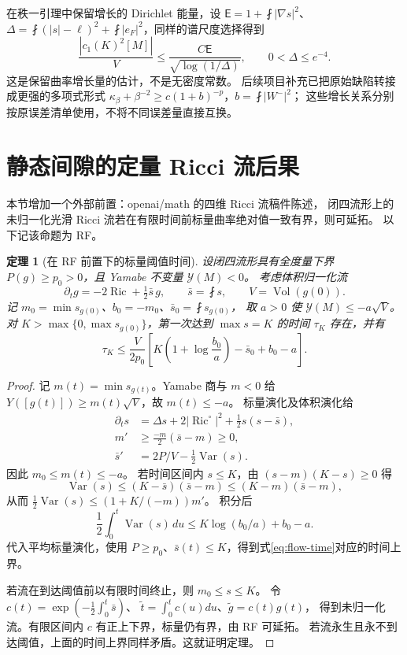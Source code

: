 \documentclass[UTF8,11pt,a4paper,fontset=none]{ctexart}
\numberwithin{equation}{section}
\newtheorem{theorem}{定理}[section]
\theoremstyle{definition}
\theoremstyle{remark}\newtheorem{remark}[theorem]{说明}
\newcommand{\Ric}{\operatorname{Ric}}
\newcommand{\Vol}{\operatorname{Vol}}
\newcommand{\Var}{\operatorname{Var}}
\newcommand{\avint}{\fint}
\begin{document}
在秩一引理中保留增长的 Dirichlet 能量，设
$\mathsf E=1+\avint|\nabla s|^2$、
$\Delta=\avint(|s|-\ell)^2+\avint|e_F|^2$，同样的谱尺度选择得到\cite{QuantEscape}
\[
\frac{|c_1(K)^2[M]|}{V}
\le\frac{C\mathsf E}{\sqrt{\log(1/\Delta)}},\qquad0<\Delta\le e^{-4}.
\]
这是保留曲率增长量的估计，不是无密度常数。
后续项目补充已把原始缺陷转接成更强的多项式形式
$\kappa_\beta+\beta^{-2}\ge c(1+b)^{-p}$，$b=\avint|W^-|^2$\cite{WeightedReport}；
这些增长关系分别按原误差清单使用，不将不同误差量直接互换。

\section{静态间隙的定量 Ricci 流后果}\label{sec:flow}

本节增加一个外部前置：openai/math 的四维 Ricci 流稿件陈述，
闭四流形上的未归一化光滑 Ricci 流若在有限时间前标量曲率绝对值一致有界，则可延拓\cite{OAIFlow}。
以下记该命题为 \textup{RF}。

\begin{theorem}[在 RF 前置下的标量阈值时间]\label{thm:flow}
设闭四流形具有全度量下界 $P(g)\ge p_0>0$，且 Yamabe 不变量 $\mathcal Y(M)<0$。
考虑体积归一化流
\[
\partial_tg=-2\Ric+\tfrac12\bar s\,g,\qquad \bar s=\avint s,
\qquad V=\Vol(g(0)).
\]
记 $m_0=\min s_{g(0)}$、$b_0=-m_0$、$\bar s_0=\avint s_{g(0)}$，
取 $a>0$ 使 $\mathcal Y(M)\le-a\sqrt V$。
对 $K>\max\{0,\max s_{g(0)}\}$，第一次达到 $\max s=K$ 的时间 $\tau_K$ 存在，并有
\begin{equation}\label{eq:flow-time}
\boxed{\tau_K\le\frac{V}{2p_0}
\left[K\left(1+\log\frac{b_0}{a}\right)-\bar s_0+b_0-a\right].}
\end{equation}
\end{theorem}
\begin{proof}
记 $m(t)=\min s_{g(t)}$。Yamabe 商与 $m<0$ 给
$Y([g(t)])\ge m(t)\sqrt V$，故 $m(t)\le-a$。
标量演化及体积演化给\cite{Ishida}
\begin{align*}
\partial_ts&=\Delta s+2|\Ric^\circ|^2+\tfrac12s(s-\bar s),\\
m'&\ge\tfrac{-m}{2}(\bar s-m)\ge0,\\
\bar s'&=2P/V-\tfrac12\Var(s).
\end{align*}
因此 $m_0\le m(t)\le-a$。
若时间区间内 $s\le K$，由 $(s-m)(K-s)\ge0$ 得
\[
\Var(s)\le(K-\bar s)(\bar s-m)\le(K-m)(\bar s-m),
\]
从而 $\tfrac12\Var(s)\le(1+K/(-m))m'$。
积分后
\[
\frac12\int_0^t\Var(s)\,du\le K\log(b_0/a)+b_0-a.
\]
代入平均标量演化，使用 $P\ge p_0$、$\bar s(t)\le K$，得到式\eqref{eq:flow-time}对应的时间上界。

若流在到达阈值前以有限时间终止，则 $m_0\le s\le K$。
令 $c(t)=\exp(-\tfrac12\int_0^t\bar s)$、
$\widetilde t=\int_0^tc(u)du$、$\widetilde g=c(t)g(t)$，
得到未归一化流。有限区间内 $c$ 有正上下界，标量仍有界，由 RF 可延拓。
若流永生且永不到达阈值，上面的时间上界同样矛盾。这就证明定理。
\end{proof}
\end{document}
